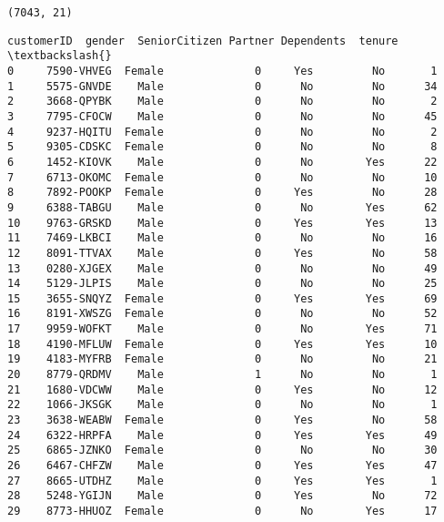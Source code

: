 \documentclass[11pt]{article}
\newcommand{\prompt}[4]{
        \llap{{\color{#2}[#3]: #4}}\vspace{-1.25em}
    }
\begin{document}
    \begin{Verbatim}[commandchars=\\\{\}]
(7043, 21)
\end{Verbatim}

            \begin{tcolorbox}[breakable, boxrule=.5pt, size=fbox, pad at break*=1mm, opacityfill=0]
\prompt{Out}{outcolor}{36}{\hspace{3.5pt}}
\begin{Verbatim}[commandchars=\\\{\}]
      customerID  gender  SeniorCitizen Partner Dependents  tenure  \textbackslash{}
0     7590-VHVEG  Female              0     Yes         No       1
1     5575-GNVDE    Male              0      No         No      34
2     3668-QPYBK    Male              0      No         No       2
3     7795-CFOCW    Male              0      No         No      45
4     9237-HQITU  Female              0      No         No       2
5     9305-CDSKC  Female              0      No         No       8
6     1452-KIOVK    Male              0      No        Yes      22
7     6713-OKOMC  Female              0      No         No      10
8     7892-POOKP  Female              0     Yes         No      28
9     6388-TABGU    Male              0      No        Yes      62
10    9763-GRSKD    Male              0     Yes        Yes      13
11    7469-LKBCI    Male              0      No         No      16
12    8091-TTVAX    Male              0     Yes         No      58
13    0280-XJGEX    Male              0      No         No      49
14    5129-JLPIS    Male              0      No         No      25
15    3655-SNQYZ  Female              0     Yes        Yes      69
16    8191-XWSZG  Female              0      No         No      52
17    9959-WOFKT    Male              0      No        Yes      71
18    4190-MFLUW  Female              0     Yes        Yes      10
19    4183-MYFRB  Female              0      No         No      21
20    8779-QRDMV    Male              1      No         No       1
21    1680-VDCWW    Male              0     Yes         No      12
22    1066-JKSGK    Male              0      No         No       1
23    3638-WEABW  Female              0     Yes         No      58
24    6322-HRPFA    Male              0     Yes        Yes      49
25    6865-JZNKO  Female              0      No         No      30
26    6467-CHFZW    Male              0     Yes        Yes      47
27    8665-UTDHZ    Male              0     Yes        Yes       1
28    5248-YGIJN    Male              0     Yes         No      72
29    8773-HHUOZ  Female              0      No        Yes      17

\end{Verbatim}
\end{tcolorbox}
\end{document}
